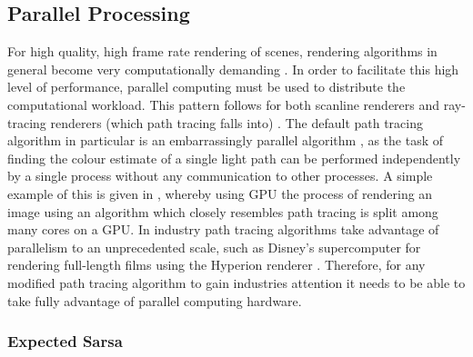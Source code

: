 \documentclass[../dissertation.tex]{subfiles}
\begin{document}
\subsection{Parallel Processing}

For high quality, high frame rate rendering of scenes, rendering algorithms in general become very computationally demanding \cite{crockett1995parallel}. In order to facilitate this high level of performance, parallel computing must be used to distribute the computational workload. This pattern follows for both scanline renderers and ray-tracing renderers (which path tracing falls into) \cite{alerstam2008parallel, fatahalian2009data}. The default path tracing algorithm in particular is an embarrassingly parallel algorithm \cite{embarissingly_parallelizable}, as the task of finding the colour estimate of a single light path can be performed independently by a single process without any communication to other processes. A simple example of this is given in \cite{accelerated_ray_tracing}, whereby using GPU the process of rendering an image using an algorithm which closely resembles path tracing is split among many cores on a GPU. In industry path tracing algorithms take advantage of parallelism to an unprecedented scale, such as Disney's supercomputer for rendering full-length films using the Hyperion renderer \cite{hyperion}. Therefore, for any modified path tracing algorithm to gain industries attention it needs to be able to take fully advantage of parallel computing hardware.\\

\subsubsection{Expected Sarsa}
\end{document}

